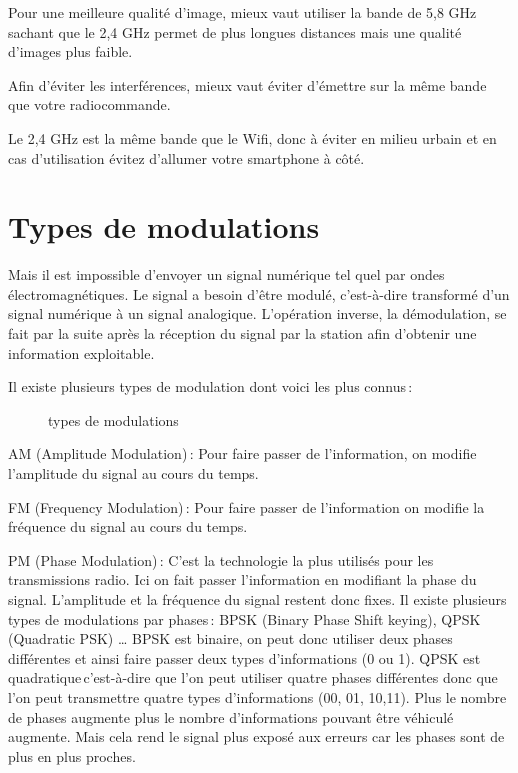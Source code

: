 Pour une meilleure qualité d’image, mieux vaut utiliser la bande de 5,8 GHz sachant que le 2,4 GHz permet de plus longues distances mais une qualité d’images plus faible. 

Afin d’éviter les interférences, mieux vaut éviter d’émettre sur la même bande que votre radiocommande. 

Le 2,4 GHz est la même bande que le Wifi, donc à éviter en milieu urbain et en cas d’utilisation évitez d’allumer votre smartphone à côté. 

\section{Types de modulations }

Mais il est impossible d’envoyer un signal numérique tel quel par ondes électromagnétiques. Le signal a besoin d’être modulé, c'est-à-dire transformé d’un signal numérique à un signal analogique. L’opération inverse, la démodulation, se fait par la suite après la réception du signal par la station afin d’obtenir une information exploitable. 

 

Il existe plusieurs types de modulation dont voici les plus connus : 

 
\begin{figure}[h]
  \centering

  \caption{types de modulations}
\end{figure}
 

AM (Amplitude Modulation) : Pour faire passer de l’information, on modifie l’amplitude du signal au cours du temps. 

 

FM (Frequency Modulation) : Pour faire passer de l’information on modifie la fréquence du signal au cours du temps. 

 

PM (Phase Modulation) : C’est la technologie la plus utilisés pour les transmissions radio. Ici on fait passer l’information en modifiant la phase du signal. L’amplitude et la fréquence du signal restent donc fixes. Il existe plusieurs types de modulations par phases : BPSK (Binary Phase Shift keying), QPSK (Quadratic PSK) … BPSK est binaire, on peut donc utiliser deux phases différentes et ainsi faire passer deux types d’informations (0 ou 1). QPSK est quadratique c'est-à-dire que l’on peut utiliser quatre phases différentes donc que l’on peut transmettre quatre types d’informations (00, 01, 10,11). Plus le nombre de phases augmente plus le nombre d’informations pouvant être véhiculé augmente. Mais cela rend le signal plus  exposé aux erreurs car les phases sont de plus en plus proches. 

